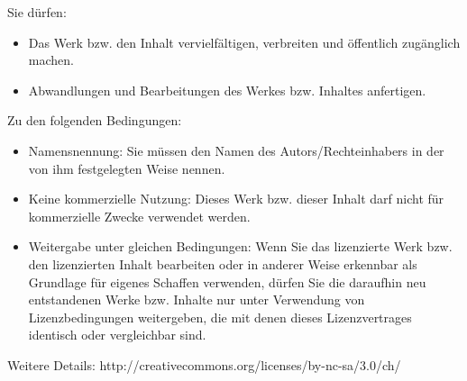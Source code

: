 {    Sie dürfen:
    \begin{itemize}
        \item Das Werk bzw. den Inhalt vervielfältigen, verbreiten und öffentlich
        zugänglich machen.
        \item Abwandlungen und Bearbeitungen des Werkes bzw. Inhaltes anfertigen.
    \end{itemize}
    Zu den folgenden Bedingungen:
    \begin{itemize}
        \item Namensnennung: Sie müssen den Namen des Autors/Rechteinhabers in der von ihm
        festgelegten Weise nennen.
        \item Keine kommerzielle Nutzung: Dieses Werk bzw. dieser Inhalt darf nicht für
        kommerzielle Zwecke verwendet werden.
        \item  Weitergabe unter gleichen Bedingungen: Wenn Sie das lizenzierte Werk bzw. den
        lizenzierten Inhalt bearbeiten oder in anderer Weise erkennbar als Grundlage
        für eigenes Schaffen verwenden, dürfen Sie die daraufhin neu entstandenen
        Werke bzw. Inhalte nur unter Verwendung von Lizenzbedingungen weitergeben,
        die mit denen dieses Lizenzvertrages identisch oder vergleichbar sind.
    \end{itemize}
    Weitere Details: http://creativecommons.org/licenses/by-nc-sa/3.0/ch/
}
\clearpage
{}%